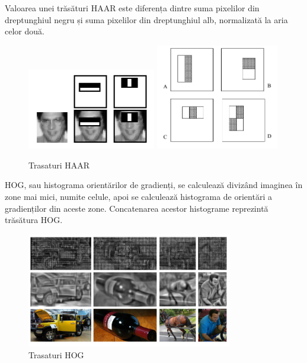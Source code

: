 Valoarea unei trăsături HAAR este diferența dintre suma pixelilor din dreptunghiul negru și suma pixelilor din dreptunghiul alb, normalizată la aria celor două.
\begin{figure}[H]
	\centering
		\includegraphics[width=0.50\textwidth]{imagini/haar0.png}
		\includegraphics[width=0.48\textwidth]{imagini/haar1.png}
	\caption{Trasaturi HAAR\protect\footnotemark}
	\label{fig:haarfeatures}
\end{figure}

HOG, sau histograma orientărilor de gradienți, se calculează divizând imaginea în zone mai mici, numite celule, apoi se calculează histograma de orientări a gradienților din aceste zone. 
Concatenarea acestor histograme reprezintă trăsătura HOG.
\begin{figure}[H]
	\centering
		\includegraphics[width=0.80\textwidth]{imagini/hog0.png}
	\caption{Trasaturi HOG\protect\footnotemark}
	\label{fig:hog0}
\end{figure}

